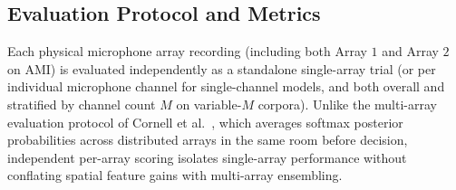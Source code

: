 \documentclass[lettersize,journal]{IEEEtran}
\begin{document}
\subsection{Evaluation Protocol and Metrics}
Each physical microphone array recording (including both Array $1$ and Array $2$ on \gls{AMI}) is evaluated independently as a standalone single-array trial (or per individual microphone channel for single-channel models, and both overall and stratified by channel count $M$ on variable-$M$ corpora). Unlike the multi-array evaluation protocol of Cornell et al.~\cite{cornell2022overlapped}, which averages softmax posterior probabilities across distributed arrays in the same room before decision, independent per-array scoring isolates single-array performance without conflating spatial feature gains with multi-array ensembling.
\end{document}
